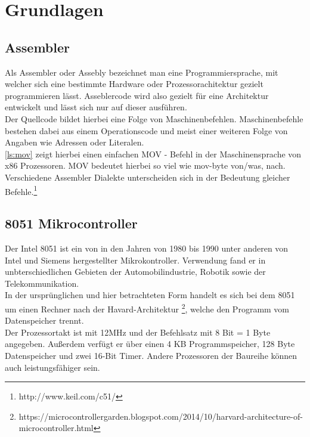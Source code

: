 \documentclass[a4paper,12pt]{article}
\begin{document}
	\newpage
	
	\section{Grundlagen}
	\subsection{Assembler}
	Als Assembler oder Assebly bezeichnet man eine Programmiersprache, mit welcher sich eine bestimmte Hardware oder Prozessorachitektur gezielt programmieren lässt. Asseblercode wird also gezielt für eine Architektur entwickelt und lässt sich nur auf dieser ausführen.\\
	Der Quellcode bildet hierbei eine Folge von Maschinenbefehlen. Maschinenbefehle bestehen dabei aus einem Operationscode und meist einer weiteren Folge von Angaben wie Adressen oder Literalen.\\
	\ref{ls:mov} zeigt hierbei einen einfachen MOV - Befehl in  der Maschinensprache von x86 Prozessoren. MOV bedeutet hierbei so viel wie mov-byte von/was, nach. Verschiedene Assembler Dialekte unterscheiden sich in der Bedeutung gleicher Befehle.\footnote{http://www.keil.com/c51/} \\
	
	\subsection{8051 Mikrocontroller}
	Der Intel 8051 ist ein von in den Jahren von 1980 bis 1990 unter anderen von Intel und Siemens hergestellter Mikrokontroller. Verwendung fand er in unbterschiedlichen Gebieten der Automobilindustrie, Robotik sowie der Telekommunikation.\\
	In der ursprünglichen und hier betrachteten Form handelt es sich bei dem 8051 um einen Rechner nach der Havard-Architektur \footnote{https://microcontrollergarden.blogspot.com/2014/10/harvard-architecture-of-microcontroller.html}, welche den Programm vom Datenspeicher trennt.\\
	Der Prozessortakt ist mit 12MHz und der Befehlsatz mit 8 Bit = 1 Byte angegeben. Außerdem verfügt er über einen 4 KB Programmspeicher, 128 Byte Datenspeicher und zwei 16-Bit Timer. Andere Prozessoren der Baureihe können auch leistungsfähiger sein.\\
	
	
\end{document}
